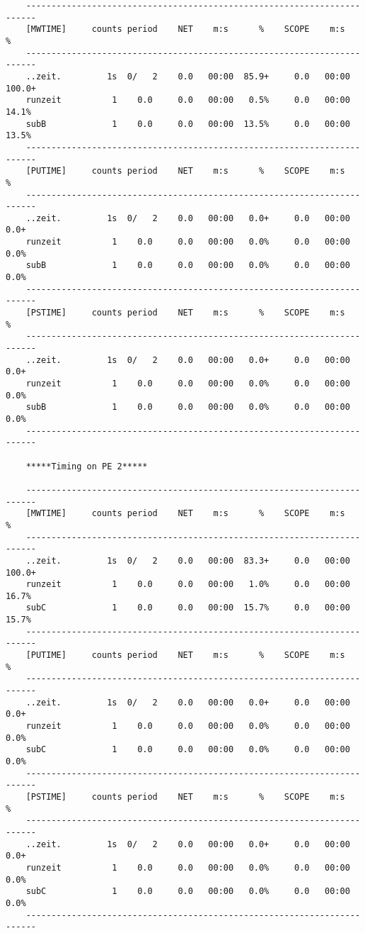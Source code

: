 \begin{verbatim}
    ------------------------------------------------------------------------
    [MWTIME]     counts period    NET    m:s      %    SCOPE    m:s      %
    ------------------------------------------------------------------------
    ..zeit.         1s  0/   2    0.0   00:00  85.9+     0.0   00:00 100.0+
    runzeit          1    0.0     0.0   00:00   0.5%     0.0   00:00  14.1%
    subB             1    0.0     0.0   00:00  13.5%     0.0   00:00  13.5%
    ------------------------------------------------------------------------
    [PUTIME]     counts period    NET    m:s      %    SCOPE    m:s      %
    ------------------------------------------------------------------------
    ..zeit.         1s  0/   2    0.0   00:00   0.0+     0.0   00:00   0.0+
    runzeit          1    0.0     0.0   00:00   0.0%     0.0   00:00   0.0%
    subB             1    0.0     0.0   00:00   0.0%     0.0   00:00   0.0%
    ------------------------------------------------------------------------
    [PSTIME]     counts period    NET    m:s      %    SCOPE    m:s      %
    ------------------------------------------------------------------------
    ..zeit.         1s  0/   2    0.0   00:00   0.0+     0.0   00:00   0.0+
    runzeit          1    0.0     0.0   00:00   0.0%     0.0   00:00   0.0%
    subB             1    0.0     0.0   00:00   0.0%     0.0   00:00   0.0%
    ------------------------------------------------------------------------

    *****Timing on PE 2*****
    
    ------------------------------------------------------------------------
    [MWTIME]     counts period    NET    m:s      %    SCOPE    m:s      %
    ------------------------------------------------------------------------
    ..zeit.         1s  0/   2    0.0   00:00  83.3+     0.0   00:00 100.0+
    runzeit          1    0.0     0.0   00:00   1.0%     0.0   00:00  16.7%
    subC             1    0.0     0.0   00:00  15.7%     0.0   00:00  15.7%
    ------------------------------------------------------------------------
    [PUTIME]     counts period    NET    m:s      %    SCOPE    m:s      %
    ------------------------------------------------------------------------
    ..zeit.         1s  0/   2    0.0   00:00   0.0+     0.0   00:00   0.0+
    runzeit          1    0.0     0.0   00:00   0.0%     0.0   00:00   0.0%
    subC             1    0.0     0.0   00:00   0.0%     0.0   00:00   0.0%
    ------------------------------------------------------------------------
    [PSTIME]     counts period    NET    m:s      %    SCOPE    m:s      %
    ------------------------------------------------------------------------
    ..zeit.         1s  0/   2    0.0   00:00   0.0+     0.0   00:00   0.0+
    runzeit          1    0.0     0.0   00:00   0.0%     0.0   00:00   0.0%
    subC             1    0.0     0.0   00:00   0.0%     0.0   00:00   0.0%
    ------------------------------------------------------------------------
\end{verbatim}

